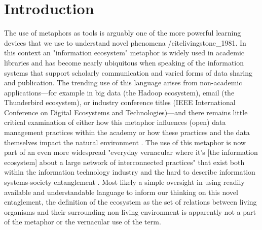\section{Introduction}

The use of metaphors as tools is arguably one of the more powerful learning devices that we use to understand novel phenomena /cite{livingstone_1981}. In this context an "information ecosystem" metaphor is widely used in academic libraries and has become nearly ubiquitous when speaking of the information systems that support scholarly communication and varied forms of data sharing and publication. The trending use of this language arises from non-academic applications—for example in big data (the Hadoop ecosystem), email (the Thunderbird ecosystem), or industry conference titles (IEEE International Conference on Digital Ecosystems and Technologies)—and there remains little critical examination of either how this metaphor influences (open) data management practices within the academy or how these practices and the data themselves impact the natural environment \cite[although for contributions from human ecology see][]{stepp_1999}. The use of this metaphor is now part of an even more widespread "everyday vernacular where it’s [the information ecosystem] about a large network of interconnected practices" that exist both within the information technology industry and the hard to describe information systems-society entanglement \cite{boyd_2016}. Most likely a simple oversight in using readily available and understandable language to inform our thinking on this novel entaglement, the definition of the ecosystem as the set of relations between living organisms and their surrounding non-living environment is apparently not a part of the metaphor or the vernacular use of the term.

